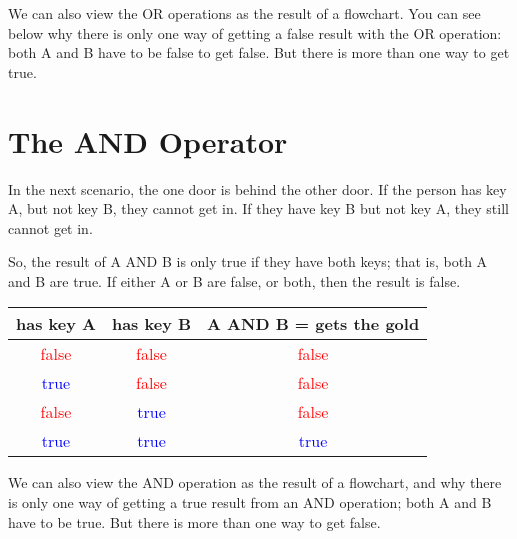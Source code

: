 We can also view the OR operations as the result of a flowchart. You can see below why there is only one way of getting a false result with the OR operation: both A and B have to be false to get false. But there is more than one way to get true.

\begin{center} \end{center}

\section{The AND Operator}

In the next scenario, the one door is behind the other door. If the person has key A, but not key B, they cannot get in. If they have key B but not key A, they still cannot get in. \\

\begin{center} \end{center}

So, the result of A AND B is only true if they have both keys; that is, both A and B are true. If either A or B are false, or both, then the result is false.

\begin{center}
	\begin{tabular}{c | c | c}
		has key A & has key B & A AND B = gets the gold \\ \hline
		\textcolor{red}{false} & \textcolor{red}{false} & \textcolor{red}{false}\\ \hline
		\textcolor{blue}{true} & \textcolor{red}{false} & \textcolor{red}{false} \\ \hline
		\textcolor{red}{false} & \textcolor{blue}{true} & \textcolor{red}{false} \\ \hline
		\textcolor{blue}{true} & \textcolor{blue}{true} & \textcolor{blue}{true} \\ \hline
	\end{tabular}
\end{center}

We can also view the AND operation as the result of a flowchart, and why there is only one way of getting a true result from an AND operation; both A and B have to be true. But there is more than one way to get false.

\begin{center} \end{center}

